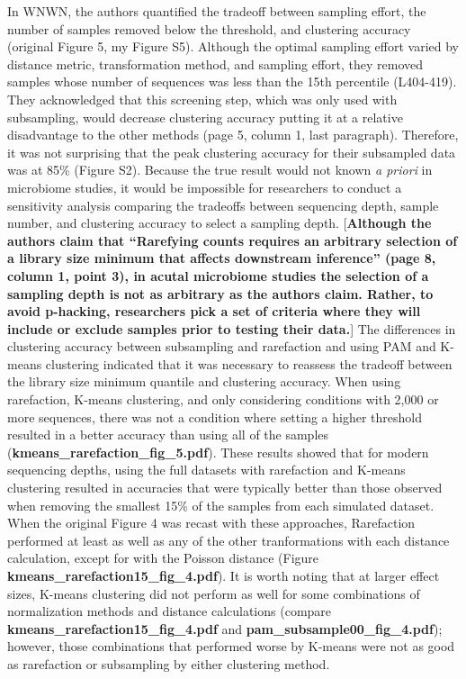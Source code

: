 \documentclass[
]{article}
\begin{document}
In WNWN, the authors quantified the tradeoff between sampling effort,
the number of samples removed below the threshold, and clustering
accuracy (original Figure 5, my Figure S5). Although the optimal
sampling effort varied by distance metric, transformation method, and
sampling effort, they removed samples whose number of sequences was less
than the 15th percentile (L404-419). They acknowledged that this
screening step, which was only used with subsampling, would decrease
clustering accuracy putting it at a relative disadvantage to the other
methods (page 5, column 1, last paragraph). Therefore, it was not
surprising that the peak clustering accuracy for their subsampled data
was at 85\% (Figure S2). Because the true result would not known \emph{a
priori} in microbiome studies, it would be impossible for researchers to
conduct a sensitivity analysis comparing the tradeoffs between
sequencing depth, sample number, and clustering accuracy to select a
sampling depth. {[}\textbf{Although the authors claim that ``Rarefying
counts requires an arbitrary selection of a library size minimum that
affects downstream inference'' (page 8, column 1, point 3), in acutal
microbiome studies the selection of a sampling depth is not as arbitrary
as the authors claim. Rather, to avoid p-hacking, researchers pick a set
of criteria where they will include or exclude samples prior to testing
their data.}{]} The differences in clustering accuracy between
subsampling and rarefaction and using PAM and K-means clustering
indicated that it was necessary to reassess the tradeoff between the
library size minimum quantile and clustering accuracy. When using
rarefaction, K-means clustering, and only considering conditions with
2,000 or more sequences, there was not a condition where setting a
higher threshold resulted in a better accuracy than using all of the
samples (\textbf{kmeans\_rarefaction\_fig\_5.pdf}). These results showed
that for modern sequencing depths, using the full datasets with
rarefaction and K-means clustering resulted in accuracies that were
typically better than those observed when removing the smallest 15\% of
the samples from each simulated dataset. When the original Figure 4 was
recast with these approaches, Rarefaction performed at least as well as
any of the other tranformations with each distance calculation, except
for with the Poisson distance (Figure
\textbf{kmeans\_rarefaction15\_fig\_4.pdf}). It is worth noting that at
larger effect sizes, K-means clustering did not perform as well for some
combinations of normalization methods and distance calculations (compare
\textbf{kmeans\_rarefaction15\_fig\_4.pdf} and
\textbf{pam\_subsample00\_fig\_4.pdf}); however, those combinations that
performed worse by K-means were not as good as rarefaction or
subsampling by either clustering method.
\end{document}
